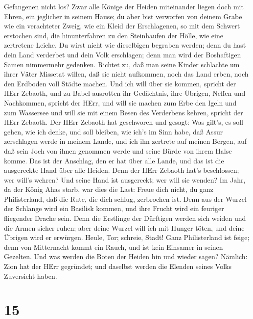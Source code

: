 Gefangenen nicht los?  Zwar alle Könige der Heiden
miteinander liegen doch mit Ehren, ein jeglicher in seinem Hause;
 du aber bist verworfen von deinem Grabe wie ein
verachteter Zweig, wie ein Kleid der Erschlagenen, so mit dem Schwert
erstochen sind, die hinunterfahren zu den Steinhaufen der Hölle, wie
eine zertretene Leiche.  Du wirst nicht wie dieselbigen
begraben werden; denn du hast dein Land verderbet und dein Volk
erschlagen; denn man wird der Boshaftigen Samen nimmermehr gedenken.
 Richtet zu, daß man seine Kinder schlachte um ihrer Väter
Missetat willen, daß sie nicht aufkommen, noch das Land erben, noch den
Erdboden voll Städte machen.  Und ich will über sie kommen,
spricht der HErr Zebaoth, und zu Babel ausrotten ihr Gedächtnis, ihre
Übrigen, Neffen und Nachkommen, spricht der HErr,  und will
sie machen zum Erbe den Igeln und zum Wassersee und will sie mit einem
Besen des Verderbens kehren, spricht der HErr Zebaoth.  Der
HErr Zebaoth hat geschworen und gesagt: Was gilt's, es soll gehen, wie
ich denke, und soll bleiben, wie ich's im Sinn habe,  daß
Assur zerschlagen werde in meinem Lande, und ich ihn zertrete auf meinen
Bergen, auf daß sein Joch von ihnen genommen werde und seine Bürde von
ihrem Halse komme.  Das ist der Anschlag, den er hat über
alle Lande, und das ist die ausgereckte Hand über alle Heiden.
 Denn der HErr Zebaoth hat's beschlossen; wer will's
wehren? Und seine Hand ist ausgereckt; wer will sie wenden?
 Im Jahr, da der König Ahas starb, war dies die Last:
 Freue dich nicht, du ganz Philisterland, daß die Rute, die
dich schlug, zerbrochen ist. Denn aus der Wurzel der Schlange wird ein
Basilisk kommen, und ihre Frucht wird ein feuriger fliegender Drache
sein.  Denn die Erstlinge der Dürftigen werden sich weiden
und die Armen sicher ruhen; aber deine Wurzel will ich mit Hunger töten,
und deine Übrigen wird er erwürgen.  Heule, Tor; schreie,
Stadt! Ganz Philisterland ist feige; denn von Mitternacht kommt ein
Rauch, und ist kein Einsamer in seinen Gezelten.  Und was
werden die Boten der Heiden hin und wieder sagen? Nämlich: Zion hat der
HErr gegründet; und daselbst werden die Elenden seines Volks Zuversicht
haben.

\hypertarget{section-14}{%
\section{15}\label{section-14}}

